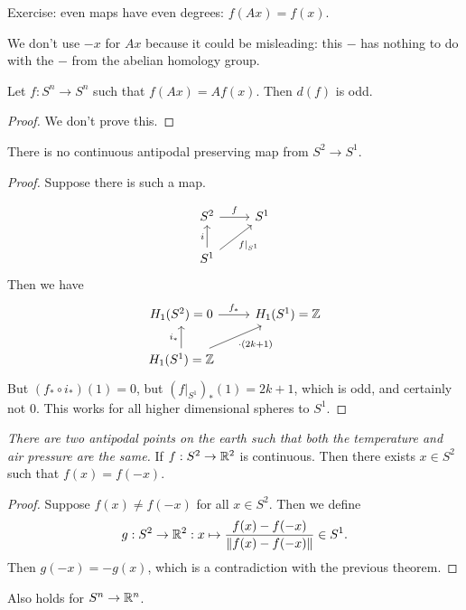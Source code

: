 \begin{remark}
    Exercise: even maps have even degrees: $f(A x) = f(x)$.
\end{remark}
\begin{remark}
    We don't use $- x$ for $Ax$ because it could be misleading: this $-$ has nothing to do with the $-$ from the abelian homology group.
\end{remark}

\begin{theorem}
    Let $f: S^{n} \to  S^{n}$ such that $f(Ax) = A f(x)$.
    Then  $d(f)$ is odd.
\end{theorem}
\begin{proof}
    We don't prove this.
\end{proof}

\begin{theorem}
    There is no continuous antipodal preserving map from $S^2 \to  S^{1}$.
\end{theorem}
\begin{proof}
    Suppose there is such a map.
    \begin{figure}[H]
        \centering
        \label{fig:no-antipodal-preserving-map-from-s2-to-s1}
    \end{figure}
\[
    \begin{tikzcd}
        S^2 \arrow[r, "f"] & S^{1}\\
        S^{1} \arrow[u, "i"] \arrow[ur, swap, "f|_{S^{1}}"] &
    \end{tikzcd}
\]
Then we have
\[
    \begin{tikzcd}
        H_1(S^{2}) = 0 \arrow[r, "f_*"] &H_1(S^{1}) = \Z\\
        H_1(S^{1}) = \Z \arrow[u, "i_*"] \arrow[ur, swap, "\cdot (2k+1)"]
    \end{tikzcd}
\]
But $(f_*  \circ  i_*)(1) = 0$, but $(f|_{S^{1}})_*(1) = 2k+1$, which is odd, and certainly not $0$.
This works for all higher dimensional spheres to $S^1$.
\end{proof}


\begin{theorem}
    \emph{There are two antipodal points on the earth such that both the temperature and air pressure are the same.}
    If $f: S^{2} \to  \mathbb{R}^2$ is continuous.
    Then there exists $x \in S^2$ such that $f(x) = f(-x)$.
\end{theorem}
\begin{proof}
    Suppose $f(x) \neq f(-x)$ for all  $x \in S^2$.
    Then  we define
    \[
        g: S^2 \to  \mathbb{R}^2: x \mapsto \frac{f(x) - f(-x)}{\|f(x) - f(-x)\|} \in S^1
    .\] 
    Then $g(-x) = -g(x)$, which is a contradiction with the previous theorem.
\end{proof}
\begin{remark}
    Also holds for $S^{n}\to \mathbb{R}^n$.
\end{remark}


